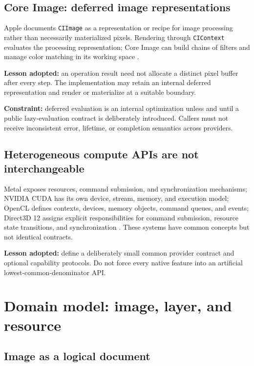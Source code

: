 \documentclass[11pt,a4paper,oneside]{article}
\begin{document}
\subsection{Core Image: deferred image representations}

Apple documents \texttt{CIImage} as a representation or recipe for image processing rather than necessarily materialized pixels. Rendering through \texttt{CIContext} evaluates the processing representation; Core Image can build chains of filters and manage color matching in its working space \cite{coreimage-ciimage,coreimage-cicontext,coreimage-overview}.

\textbf{Lesson adopted:} an operation result need not allocate a distinct pixel buffer after every step. The implementation may retain an internal deferred representation and render or materialize at a suitable boundary.

\textbf{Constraint:} deferred evaluation is an internal optimization unless and until a public lazy-evaluation contract is deliberately introduced. Callers must not receive inconsistent error, lifetime, or completion semantics across providers.

\subsection{Heterogeneous compute APIs are not interchangeable}

Metal exposes resources, command submission, and synchronization mechanisms; NVIDIA CUDA has its own device, stream, memory, and execution model; OpenCL defines contexts, devices, memory objects, command queues, and events; Direct3D 12 assigns explicit responsibilities for command submission, resource state transitions, and synchronization \cite{metal-sync,cuda-guide,opencl-spec,d3d12-queues,d3d12-barriers}. These systems have common concepts but not identical contracts.

\textbf{Lesson adopted:} define a deliberately small common provider contract and optional capability protocols. Do not force every native feature into an artificial lowest-common-denominator API.

\section{Domain model: image, layer, and resource}

\subsection{Image as a logical document}
\end{document}
